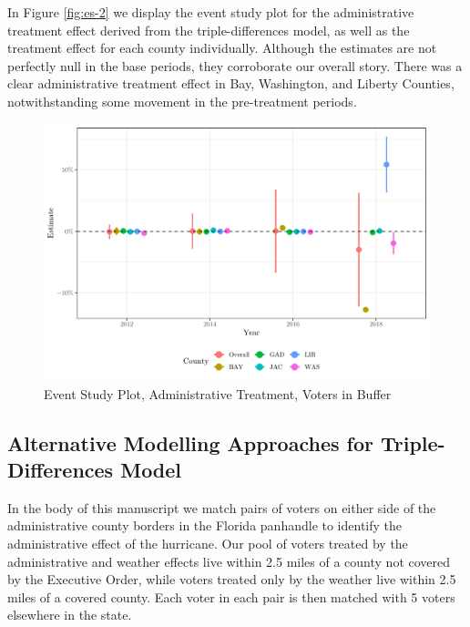 \documentclass[
  12pt,
]{article}
\begin{document}
In Figure \ref{fig:es-2} we display the event study plot for the administrative treatment effect derived from the triple-differences model, as well as the treatment effect for each county individually. Although the estimates are not perfectly null in the base periods, they corroborate our overall story. There was a clear administrative treatment effect in Bay, Washington, and Liberty Counties, notwithstanding some movement in the pre-treatment periods.

\begin{figure}[H]

{\centering \includegraphics{si_files/figure-latex/es2-1} 

}

\caption{\label{fig:es-2}Event Study Plot, Administrative Treatment, Voters in Buffer}\label{fig:es2}
\end{figure}

\hypertarget{alternative-modelling-approaches-for-triple-differences-model}{%
\subsection*{Alternative Modelling Approaches for Triple-Differences Model}\label{alternative-modelling-approaches-for-triple-differences-model}}

In the body of this manuscript we match pairs of voters on either side of the administrative county borders in the Florida panhandle to identify the administrative effect of the hurricane. Our pool of voters treated by the administrative and weather effects live within 2.5 miles of a county not covered by the Executive Order, while voters treated only by the weather live within 2.5 miles of a covered county. Each voter in each pair is then matched with 5 voters elsewhere in the state.
\end{document}
